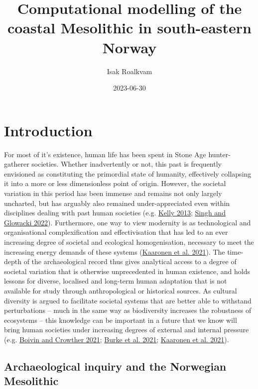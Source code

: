 \documentclass[
  12pt,
  a4paper,
  oneside]{book}
\title{Computational modelling of the coastal Mesolithic in south-eastern Norway}
\author{Isak Roalkvam}
\date{2023-06-30}
\begin{document}
\maketitle

{
\setcounter{tocdepth}{2}
\tableofcontents
}
\mainmatter

\hypertarget{introduction}{%
\chapter{Introduction}\label{introduction}}

For most of it's existence, human life has been spent in Stone Age hunter-gatherer societies. Whether inadvertently or not, this past is frequently envisioned as constituting the primordial state of humanity, effectively collapsing it into a more or less dimensionless point of origin. However, the societal variation in this period has been immense and remains not only largely uncharted, but has arguably also remained under-appreciated even within disciplines dealing with past human societies (e.g. \protect\hyperlink{ref-kelly2013}{Kelly 2013}; \protect\hyperlink{ref-singh2022}{Singh and Glowacki 2022}). Furthermore, one way to view modernity is as technological and organisational complexification and effectivisation that has led to an ever increasing degree of societal and ecological homogenisation, necessary to meet the increasing energy demands of these systems (\protect\hyperlink{ref-kaaronen2021}{Kaaronen et al. 2021}). The time-depth of the archaeological record thus gives analytical access to a degree of societal variation that is otherwise unprecedented in human existence, and holds lessons for diverse, localised and long-term human adaptation that is not available for study through anthropological or historical sources. As cultural diversity is argued to facilitate societal systems that are better able to withstand perturbations -- much in the same way as biodiversity increases the robustness of ecosystems -- this knowledge can be important in a future that we know will bring human societies under increasing degrees of external and internal pressure (e.g. \protect\hyperlink{ref-boivin2021}{Boivin and Crowther 2021}; \protect\hyperlink{ref-burke2021}{Burke et al. 2021}; \protect\hyperlink{ref-kaaronen2021}{Kaaronen et al. 2021}).

\hypertarget{archaeological-inquiry-and-the-norwegian-mesolithic}{%
\section{Archaeological inquiry and the Norwegian Mesolithic}\label{archaeological-inquiry-and-the-norwegian-mesolithic}}
\end{document}
